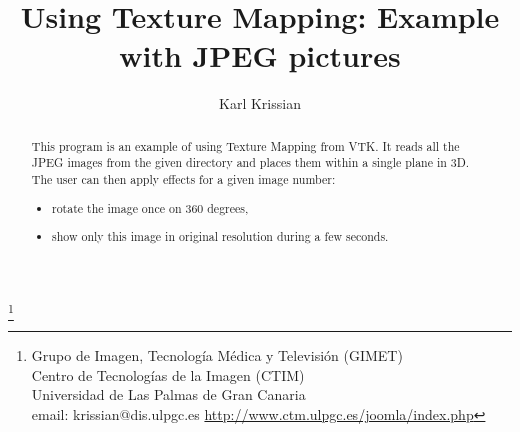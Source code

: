 \documentclass{article}
\begin{document}
\title{Using Texture Mapping: Example with JPEG pictures}
\author{ Karl Krissian}
\thanks{
Grupo de Imagen, Tecnolog\'ia M\'edica y Televisi\'on (GIMET)\\
Centro de Tecnolog\'ias de la Imagen (CTIM)\\
Universidad de Las Palmas de Gran Canaria\\
email: krissian@dis.ulpgc.es
\url{http://www.ctm.ulpgc.es/joomla/index.php}
}


\maketitle

\begin{abstract}
This program is an example of using Texture Mapping from VTK.
It reads all the JPEG images from the given directory and places them within a single plane
in 3D.
The user can then apply effects for a given image number:
\begin{itemize}
  \item rotate the image once on 360 degrees,
  \item show only this image in original resolution during a few seconds.
\end{itemize}
\end{abstract}
\end{document}

